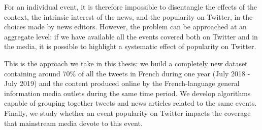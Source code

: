 For an individual event, it is therefore impossible to disentangle the effects of the context, the intrinsic interest of the news, and the popularity on Twitter, in the choices made by news editors. However, the problem can be approached at an aggregate level: if we have available all the events covered both on Twitter and in the media, it is possible to highlight a systematic effect of popularity on Twitter. 

This is the approach we take in this thesis: we build a completely
new dataset containing around 70\% of all the tweets in French during one year (July 2018 - July 2019) and the content produced online by the French-language general information media outlets during the same time period. We develop algorithms capable of grouping together tweets and news articles related to the same events. Finally, we study whether an event popularity on Twitter impacts the coverage that mainstream media devote to this event.

